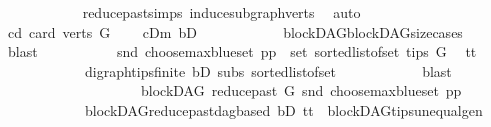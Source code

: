 \begin{isabellebody}
\ \ \ \ \ \ \ \ \ \ \isamarkupfalse%
\ reduce{\isacharunderscore}{\kern0pt}past{\isachardot}{\kern0pt}simps\ induce{\isacharunderscore}{\kern0pt}subgraph{\isacharunderscore}{\kern0pt}verts\ \isamarkupfalse%
\ auto\isanewline
\ \ \ \ \ \ \ \ \isamarkupfalse%
\ cd{}{\isacharcolon}{\kern0pt}\ {\isachardoublequoteopen}card\ {\isacharparenleft}{\kern0pt}verts\ G{\isacharparenright}{\kern0pt}\ {\isachargreater}{\kern0pt}\ {}{\isachardoublequoteclose}\ \isamarkupfalse%
\ cDm\ bD\isanewline
\ \ \ \ \ \ \ \ \ \ \isamarkupfalse%
\ blockDAG{\isachardot}{\kern0pt}blockDAG{\isacharunderscore}{\kern0pt}size{\isacharunderscore}{\kern0pt}cases\ \isamarkupfalse%
\ blast\ \isanewline
\ \ \ \ \ \ \ \ \isamarkupfalse%
\ {\isachardoublequoteopen}{\isacharparenleft}{\kern0pt}snd\ {\isacharparenleft}{\kern0pt}choose{\isacharunderscore}{\kern0pt}max{\isacharunderscore}{\kern0pt}blue{\isacharunderscore}{\kern0pt}set\ pp{\isacharparenright}{\kern0pt}{\isacharparenright}{\kern0pt}\ {\isasymin}\ set\ {\isacharparenleft}{\kern0pt}sorted{\isacharunderscore}{\kern0pt}list{\isacharunderscore}{\kern0pt}of{\isacharunderscore}{\kern0pt}set\ {\isacharparenleft}{\kern0pt}tips\ G{\isacharparenright}{\kern0pt}{\isacharparenright}{\kern0pt}{\isachardoublequoteclose}\ \isamarkupfalse%
\ tt{}\isanewline
\ \ \ \ \ \ \ \ \ \ \ \ digraph{\isachardot}{\kern0pt}tips{\isacharunderscore}{\kern0pt}finite\ bD\ subs\ sorted{\isacharunderscore}{\kern0pt}list{\isacharunderscore}{\kern0pt}of{\isacharunderscore}{\kern0pt}set{\isacharparenleft}{\kern0pt}{}{\isacharparenright}{\kern0pt}\isanewline
\ \ \ \ \ \ \ \ \ \ \isamarkupfalse%
\ blast\ \isanewline
\ \ \ \ \ \ \ \ \isamarkupfalse%
\ \isanewline
\ \ \ \ \ \ \ \ \isamarkupfalse%
\ {\isachardoublequoteopen}blockDAG\ {\isacharparenleft}{\kern0pt}reduce{\isacharunderscore}{\kern0pt}past\ G\ {\isacharparenleft}{\kern0pt}snd\ {\isacharparenleft}{\kern0pt}choose{\isacharunderscore}{\kern0pt}max{\isacharunderscore}{\kern0pt}blue{\isacharunderscore}{\kern0pt}set\ pp{\isacharparenright}{\kern0pt}{\isacharparenright}{\kern0pt}{\isacharparenright}{\kern0pt}{\isachardoublequoteclose}\ \isamarkupfalse%
\ \isanewline
\ \ \ \ \ \ \ \ \ \ \ \ blockDAG{\isachardot}{\kern0pt}reduce{\isacharunderscore}{\kern0pt}past{\isacharunderscore}{\kern0pt}dagbased\ bD\ tt{}\ \ blockDAG{\isachardot}{\kern0pt}tips{\isacharunderscore}{\kern0pt}unequal{\isacharunderscore}{\kern0pt}gen\ \isanewline

\end{isabellebody}
